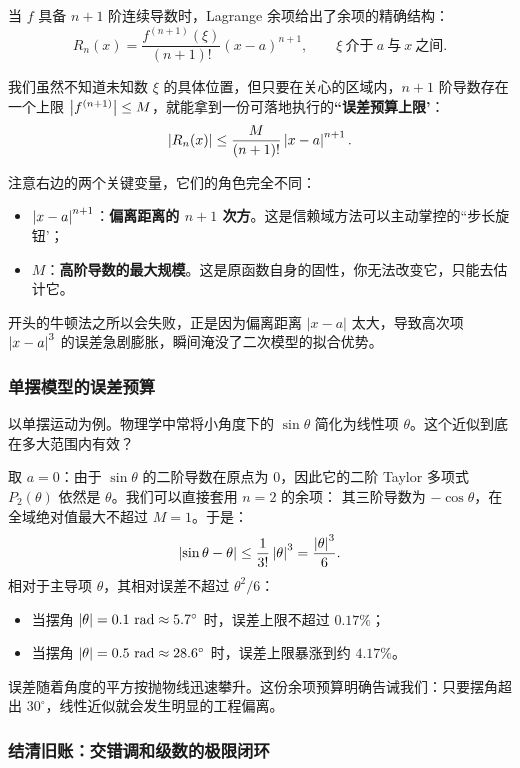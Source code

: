 当 \(f\) 具备 \(n+1\) 阶连续导数时，Lagrange 余项给出了余项的精确结构：
\[
R_n(x)=\frac{f^{(n+1)}(\xi)}{(n+1)!}(x-a)^{n+1},\qquad \xi\ \text{介于}\ a\ \text{与}\ x\ \text{之间}.
\]

我们虽然不知道未知数 \(\xi\) 的具体位置，但只要在关心的区域内，\(n+1\) 阶导数存在一个上限 \(\left|f^{(n+1)}\right| \le M\)，就能拿到一份可落地执行的\textbf{``误差预算上限'}：
\[
\left|R_n(x)\right|\le\frac{M}{(n+1)!}\left|x-a\right|^{n+1}.
\]

注意右边的两个关键变量，它们的角色完全不同：
\begin{itemize}
    \item \(\left|x-a\right|^{n+1}\)：\textbf{偏离距离的 \(n+1\) 次方}。这是信赖域方法可以主动掌控的``步长旋钮'；
    \item \(M\)：\textbf{高阶导数的最大规模}。这是原函数自身的固性，你无法改变它，只能去估计它。
\end{itemize}

开头的牛顿法之所以会失败，正是因为偏离距离 \(|x-a|\) 太大，导致高次项 \(\left|x-a\right|^{3}\) 的误差急剧膨胀，瞬间淹没了二次模型的拟合优势。

\subsubsection*{单摆模型的误差预算}

以单摆运动为例。物理学中常将小角度下的 \(\sin\theta\) 简化为线性项 \(\theta\)。这个近似到底在多大范围内有效？

取 \(a=0\)：由于 \(\sin\theta\) 的二阶导数在原点为 0，因此它的二阶 Taylor 多项式 \(P_2(\theta)\) 依然是 \(\theta\)。我们可以直接套用 \(n=2\) 的余项：
其三阶导数为 \(-\cos\theta\)，在全域绝对值最大不超过 \(M=1\)。于是：
\[
\left|\sin\theta-\theta\right| \le \frac{1}{3!} \left|\theta\right|^3 = \frac{\left|\theta\right|^3}{6}.
\]
相对于主导项 \(\theta\)，其相对误差不超过 \(\theta^2 / 6\)：
\begin{itemize}
    \item 当摆角 \(\left|\theta\right| = 0.1\text{ rad} \approx 5.7^\circ\) 时，误差上限不超过 \(0.17\%\)；
    \item 当摆角 \(\left|\theta\right| = 0.5\text{ rad} \approx 28.6^\circ\) 时，误差上限暴涨到约 \(4.17\%\)。
\end{itemize}
误差随着角度的平方按抛物线迅速攀升。这份余项预算明确告诫我们：只要摆角超出 \(30^\circ\)，线性近似就会发生明显的工程偏离。

\subsubsection*{结清旧账：交错调和级数的极限闭环}

